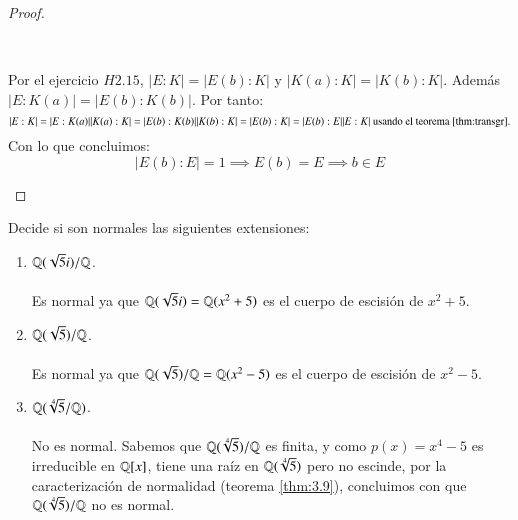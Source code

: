 \begin{proof}
\begin{itemize}
        \begin{center}
            \\
        \end{center}

        Por el ejercicio $H2.15$, $|E:K| = |E(b):K|$ y $|K(a):K| = |K(b):K|$. Además $|E:K(a)| = |E(b):K(b)|$.
        Por tanto:
        $$
            |E:K| = |E:K(a)||K(a):K| = |E(b):K(b)||K(b):K| = |E(b):K| = |E(b):E||E:K| \text{ usando el teorema \ref{thm:transgr}.}
        $$
        Con lo que concluimos:
        $$
            |E(b):E| = 1 \implies E(b) = E \implies b\in E
        $$
    \end{itemize}
\end{proof}


\begin{ex}[H3.5]
    Decide si son normales las siguientes extensiones:
    \begin{enumerate}
        \item $\mathbb{Q}(\sqrt{5}i)/\mathbb{Q}$.\\\\

        Es normal ya que $\mathbb{Q}(\sqrt{5}i) = \mathbb{Q}(x^2+5)$ es el cuerpo de escisión de $x^2+5$.
        \item $\mathbb{Q}(\sqrt{5})/\mathbb{Q}$.\\\\

        Es normal ya que $\mathbb{Q}(\sqrt{5})/\mathbb{Q} = \mathbb{Q}(x^2-5)$ es el cuerpo de escisión de $x^2-5$.

        \item $\mathbb{Q}(\sqrt[4]{5}/\mathbb{Q})$.\\\\

        No es normal. Sabemos que $\mathbb{Q}(\sqrt[4]{5})/\mathbb{Q}$ es finita, y como $p(x) = x^4 - 5$ es irreducible en $\mathbb{Q}[x]$, tiene una raíz en $\mathbb{Q}(\sqrt[4]{5})$ pero no escinde, por la caracterización de normalidad (teorema \ref{thm:3.9}), concluimos con que $\mathbb{Q}(\sqrt[4]{5})/\mathbb{Q}$ no es normal.
    \end{enumerate}
\end{ex}

